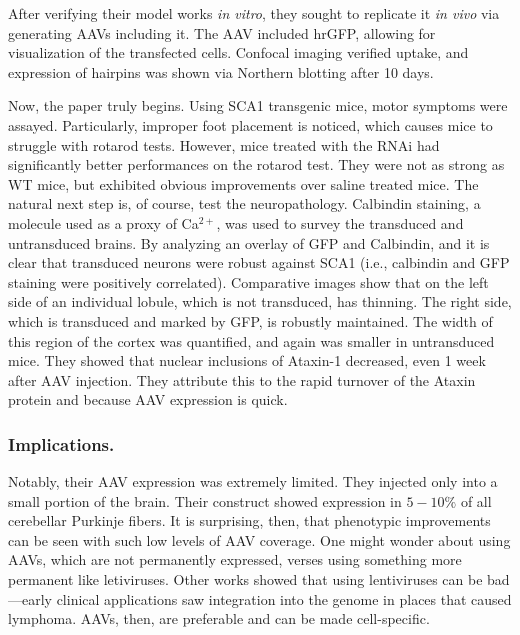 After verifying their model works \textit{in vitro}, they sought to replicate it \textit{in vivo} via generating AAVs including it. The AAV included hrGFP, allowing for visualization of the transfected cells. Confocal imaging verified uptake, and expression of hairpins was shown via Northern blotting after 10 days.\newline

Now, the paper truly begins. Using SCA1 transgenic mice, motor symptoms were assayed. Particularly, improper foot placement is noticed, which causes mice to struggle with rotarod tests. However, mice treated with the RNAi had significantly better performances on the rotarod test. They were not as strong as WT mice, but exhibited obvious improvements over saline treated mice. The natural next step is, of course, test the neuropathology. Calbindin staining, a molecule used as a proxy of Ca$^{2+}$, was used to survey the transduced and untransduced brains. By analyzing an overlay of GFP and Calbindin, and it is clear that transduced neurons were robust against SCA1 (i.e., calbindin and GFP staining were positively correlated). Comparative images show that on the left side of an individual lobule, which is not transduced, has thinning. The right side, which is transduced and marked by GFP, is robustly maintained. The width of this region of the cortex was quantified, and again was smaller in untransduced mice. They showed that nuclear inclusions of Ataxin-1 decreased, even 1 week after AAV injection. They attribute this to the rapid turnover of the Ataxin protein and because AAV expression is quick.

\subsubsection*{Implications.}

Notably, their AAV expression was extremely limited. They injected only into a small portion of the brain. Their construct showed expression in $5-10\%$ of all cerebellar Purkinje fibers. It is surprising, then, that phenotypic improvements can be seen with such low levels of AAV coverage. One  might wonder about using AAVs, which are not permanently expressed, verses using something more permanent like letiviruses. Other works showed that using lentiviruses can be bad---early clinical applications saw integration into the genome in places that caused lymphoma. AAVs, then, are preferable and can be made cell-specific.\newline


